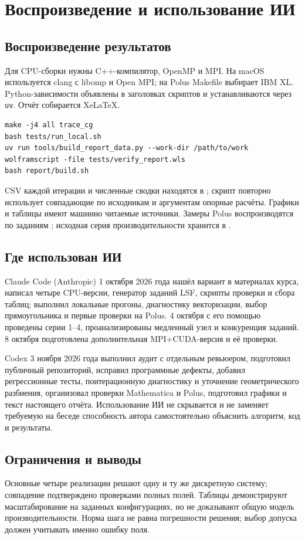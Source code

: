 \documentclass[11pt,a4paper]{article}
\begin{document}
\clearpage
\begingroup
{}
\small
\section{Воспроизведение и использование ИИ}
\subsection*{Воспроизведение результатов}
Для CPU-сборки нужны C++-компилятор, OpenMP и MPI. На macOS используется
clang с libomp и Open MPI; на Polus Makefile выбирает IBM XL.
Python-зависимости объявлены в заголовках скриптов и устанавливаются
через \texttt{uv}. Отчёт собирается XeLaTeX.
\begin{verbatim}
make -j4 all trace_cg
bash tests/run_local.sh
uv run tools/build_report_data.py --work-dir /path/to/work
wolframscript -file tests/verify_report.wls
bash report/build.sh
\end{verbatim}
CSV каждой итерации и численные сводки находятся в ;
скрипт повторно использует совпадающие по исходникам и аргументам
опорные расчёты. Графики и таблицы имеют машинно читаемые источники.
Замеры Polus воспроизводятся по заданиям ; исходная
серия производительности хранится в .

\subsection*{Где использован ИИ}
Claude Code (Anthropic) 1 октября 2026 года нашёл вариант в материалах
курса, написал четыре CPU-версии, генератор заданий LSF, скрипты
проверки и сбора таблиц; выполнил локальные прогоны, диагностику
векторизации, выбор прямоугольника и первые проверки на Polus.
4 октября с его помощью проведены серии 1--4, проанализированы
медленный узел и конкуренция заданий. 8 октября подготовлена
дополнительная MPI+CUDA-версия и её проверки.

Codex 3 ноября 2026 года выполнил аудит с отдельным ревьюером,
подготовил публичный репозиторий, исправил программные дефекты,
добавил регрессионные тесты, поитерационную диагностику и уточнение
геометрического разбиения, организовал проверки Mathematica и Polus,
подготовил графики и текст настоящего отчёта. Использование ИИ не
скрывается и не заменяет требуемую на беседе способность автора
самостоятельно объяснить алгоритм, код и результаты.

\subsection*{Ограничения и выводы}
Основные четыре реализации решают одну и ту же дискретную систему;
совпадение подтверждено проверками полных полей. Таблицы демонстрируют
масштабирование на заданных конфигурациях, но не доказывают общую
модель производительности. Норма шага не равна погрешности решения;
выбор допуска должен учитывать именно ошибку поля.
\end{document}
